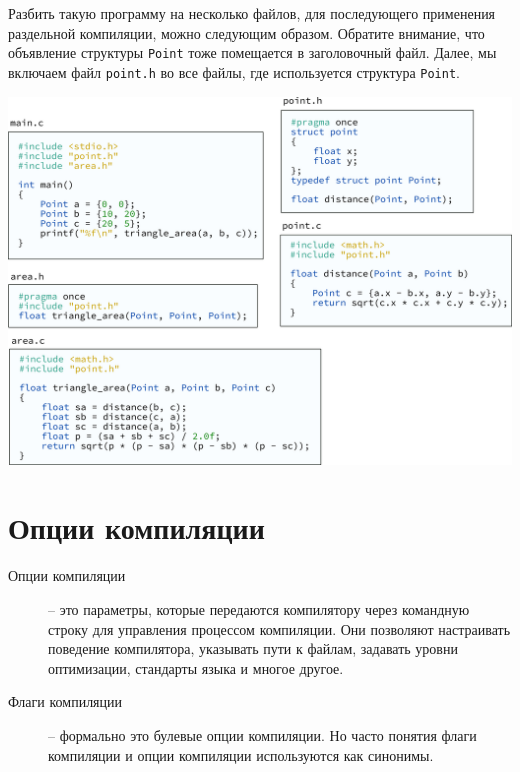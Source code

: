 \documentclass{article}
\begin{document}
\noindent
Разбить такую программу на несколько файлов, для последующего применения раздельной компиляции, можно следующим образом. Обратите внимание, что объявление структуры \texttt{Point} тоже помещается в заголовочный файл. Далее, мы включаем файл \texttt{point.h} во все файлы, где используется структура \texttt{Point}.
\begin{center}
\includegraphics[scale=0.8]{../images/09another_separate2.png}
\end{center}

\newpage
\section{Опции компиляции}
\begin{description}
\item[Опции компиляции] -- это параметры, которые передаются компилятору через командную строку для управления процессом компиляции. Они позволяют настраивать поведение компилятора, указывать пути к файлам, задавать уровни оптимизации, стандарты языка и многое другое.
\item[Флаги компиляции] -- формально это булевые опции компиляции. Но часто понятия флаги компиляции и опции компиляции используются как синонимы.
\end{description}
\end{document}
